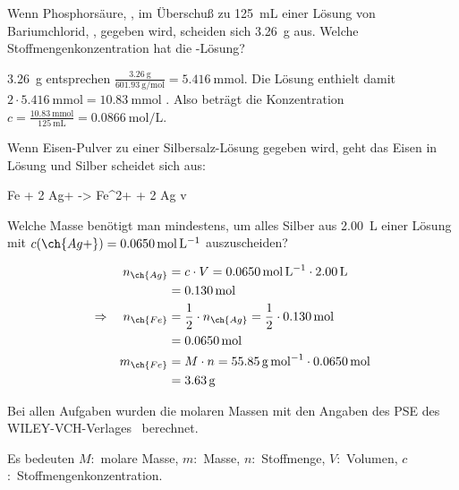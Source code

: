 \documentclass[DIV11,bib=totoc]{scrartcl}
\begin{document}
\begin{question}
Wenn Phosphorsäure, , im Überschuß zu \SI{125}{\milli\liter}
einer Lösung von Bariumchlorid, , gegeben wird, scheiden sich
\SI{3.26}{\gram}  aus.  Welche Stoffmengenkonzentration hat
die -Lösung?
\end{question}
\begin{solution}
\SI{3.26}{\gram}  entsprechen
$\frac{\SI{3.26}{\gram}}{\SI{601.93}{\gram\per\mole}} =
\SI{5.416}{\milli\mole}$.  Die Lösung enthielt damit
$2\cdot\SI{5.416}{\milli\mole} = \SI{10.83}{\milli\mole}$ .  Also
beträgt die Konzentration $c =
\frac{\SI{10.83}{\milli\mole}}{\SI{125}{\milli\liter}} =
\SI{0.0866}{\mole\per\liter}$.
\end{solution}

\begin{question}
Wenn Eisen-Pulver zu einer Silbersalz-Lösung gegeben wird, geht das Eisen in
Lösung und Silber scheidet sich aus:
\begin{reaction*}
 Fe\sld{} + 2 Ag+ \aq{} -> Fe^2+ \aq{} + 2 Ag\sld{} v
\end{reaction*}
Welche Masse  benötigt man mindestens, um alles Silber aus
\SI{2.00}{\liter} einer Lösung mit $c(\ch{Ag+}) =
\SI{0.0650}{\mole\per\liter}$ auszuscheiden?
\end{question}
\begin{solution}
\begin{align*}
  n_{\ch{Ag}}
    &= c\cdot V = \SI{0.0650}{\mole\per\liter}\cdot\SI{2.00}{\liter}\\
    &= \SI{0.130}{\mole}\\
  \Rightarrow\quad n_{\ch{Fe}}
    &= \frac{1}{2}\cdot n_{\ch{Ag}} = \frac{1}{2}\cdot\SI{0.130}{\mole}\\
    &= \SI{0.0650}{\mole}\\
  m_{\ch{Fe}}
    &= M\cdot n = \SI{55.85}{\gram\per\mole}\cdot\SI{0.0650}{\mole}\\
    &= \SI{3.63}{\gram}
\end{align*}
\end{solution}

Bei allen Aufgaben wurden die molaren Massen mit den Angaben des PSE des
WILEY-VCH-Verlages~\cite{pse_viley} berechnet.

Es bedeuten $M$:~molare Masse, $m$:~Masse, $n$:~Stoffmenge, $V$:~Volumen,
$c$:~Stoffmengenkonzentration.

\printsolutions

\printbibliography
\end{document}
